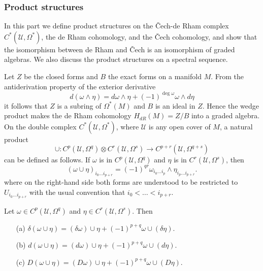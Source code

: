 \subsubsection{Product structures}
In this part we define product structures on the \v{C}ech-de Rham complex $C^*(\mathcal{U},\Omega^*)$, the de Rham cohomology, and the \v{C}ech cohomology, and show that 
the isomorphism between de Rham and \v{C}ech is an isomorphism of graded algebras. We also discuss the product structures on a spectral sequence.\par
Let $Z$ be the closed forms and $B$ the exact forms on a manifold $M$. From the antiderivation property of the exterior derivative
\[d(\omega\wedge\eta)=d\omega\wedge\eta+(-1)^{\deg\omega}\omega\wedge d\eta\]
it follows that $Z$ is a subring of $\Omega^*(M)$ and $B$ is an ideal in $Z$. Hence the wedge product makes the de Rham cohomology $H_{dR}(M)=Z/B$ into a graded algebra.
On the double complex $C^*(\mathcal{U},\Omega^*)$, where $\mathcal{U}$ is any open cover of $M$, a natural product
\[\cup:C^p(\mathcal{U},\Omega^q)\otimes C^r(\mathcal{U},\Omega^s)\to C^{p+r}(\mathcal{U},\Omega^{q+s})\]
can be defined as follows. If $\omega$ is in $C^p(\mathcal{U},\Omega^q)$ and $\eta$ is in $C^r(\mathcal{U},\Omega^s)$, then
\[(\omega\cup\eta)_{i_0\dots i_{p+r}}=(-1)^{qr}\omega_{i_0\dots i_p}\wedge\eta_{i_{p}\dots i_{p+r}}.\]
where on the right-hand side both forms are understood to be restricted to $U_{i_0\dots i_{p+r}}$ with the usual convention that $i_0<\dots<i_{p+r}$.
\begin{proposition}\label{Cech de Rham cup prod prop}
Let $\omega\in C^p(\mathcal{U},\Omega^q)$ and $\eta\in C^r(\mathcal{U},\Omega^s)$. Then
\begin{itemize}
\item[(a)] $\delta(\omega\cup\eta)=(\delta\omega)\cup\eta+(-1)^{p+q}\omega\cup(\delta\eta)$.
\item[(b)] $d(\omega\cup\eta)=(d\omega)\cup\eta+(-1)^{p+q}\omega\cup(d\eta)$.
\item[(c)] $D(\omega\cup\eta)=(D\omega)\cup\eta+(-1)^{p+q}\omega\cup(D\eta)$.
\end{itemize}
\end{proposition}

